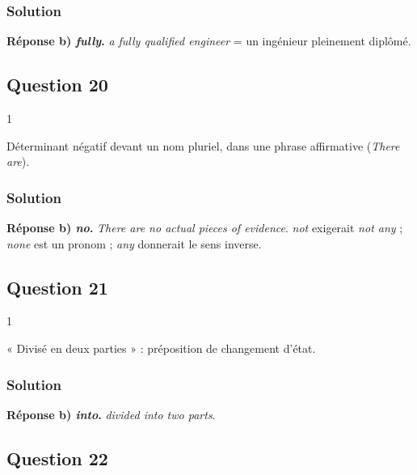 \documentclass[11pt,a4paper]{article}
\begin{document}
\hypertarget{solution-18}{%
\subsubsection{Solution}\label{solution-18}}

\textbf{Réponse b) \emph{fully}.} \emph{a fully qualified engineer} = un ingénieur pleinement diplômé.

\hypertarget{question-20}{%
\subsection{Question 20}\label{question-20}}

\begin{indication}{1}

Déterminant négatif devant un nom pluriel, dans une phrase affirmative (\emph{There are}).

\end{indication}

\hypertarget{solution-19}{%
\subsubsection{Solution}\label{solution-19}}

\textbf{Réponse b) \emph{no}.} \emph{There are no actual pieces of evidence}. \emph{not} exigerait \emph{not any} ; \emph{none} est un pronom ; \emph{any} donnerait le sens inverse.

\hypertarget{question-21}{%
\subsection{Question 21}\label{question-21}}

\begin{indication}{1}

« Divisé en deux parties » : préposition de changement d'état.

\end{indication}

\hypertarget{solution-20}{%
\subsubsection{Solution}\label{solution-20}}

\textbf{Réponse b) \emph{into}.} \emph{divided into two parts}.

\hypertarget{question-22}{%
\subsection{Question 22}\label{question-22}}
\end{document}
